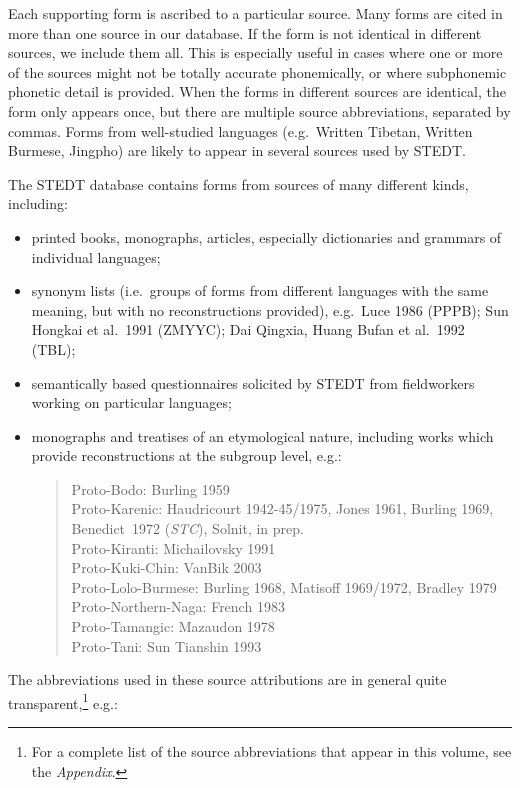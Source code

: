 Each supporting form is ascribed to a particular source.  Many forms are
cited in more than one source in our database.  If the form is not identical in
different sources, we include them all.  This is especially useful in cases
where one or more of the sources might not be totally accurate phonemically, or
where subphonemic phonetic detail is provided. When the forms in different
sources are identical, the form only appears once, but there are multiple source
abbreviations, separated by commas.  Forms from well-studied languages
(e.g.\ Written Tibetan, Written Burmese, Jingpho) are likely to appear in several
sources used by STEDT.


The STEDT database contains forms from sources of many different kinds,
including:
\begin{itemize}
\item printed books, monographs, articles, especially dictionaries and grammars of
individual languages;
\item synonym lists (i.e.\ groups of forms from different languages with the same
meaning, but with no reconstructions provided), e.g.\ Luce 1986 (PPPB); Sun
Hongkai et al.\ 1991 (ZMYYC); Dai Qingxia, Huang Bufan et al.\ 1992 (TBL);
\item semantically based questionnaires solicited by STEDT from fieldworkers working
on particular languages;
\item monographs and treatises of an etymological nature, including works which
provide reconstructions at the subgroup level, e.g.:

\begin{verse}
Proto-Bodo: Burling 1959\\
Proto-Karenic: Haudricourt 1942-45/1975, Jones 1961, Burling 1969, Benedict~1972 (\textit{STC}), Solnit, in prep.\\
Proto-Kiranti: Michailovsky 1991\\
Proto-Kuki-Chin: VanBik 2003\\
Proto-Lolo-Burmese: Burling 1968, Matisoff 1969/1972, Bradley 1979\\
Proto-Northern-Naga: French 1983\\
Proto-Tamangic: Mazaudon 1978\\
Proto-Tani: Sun Tianshin 1993\\
\end{verse}
\end{itemize}


The abbreviations used in these source attributions are in general quite
transparent,\footnote{For a complete list of the source abbreviations that
appear in this volume, see the \textit{Appendix}.} e.g.:

